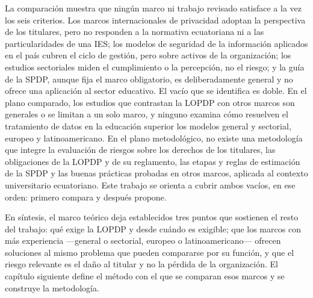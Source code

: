 La comparación muestra que ningún marco ni trabajo revisado satisface a la vez los seis criterios. Los marcos internacionales de privacidad adoptan la perspectiva de los titulares, pero no responden a la normativa ecuatoriana ni a las particularidades de una IES; los modelos de seguridad de la información aplicados en el país cubren el ciclo de gestión, pero sobre activos de la organización; los estudios sectoriales miden el cumplimiento o la percepción, no el riesgo; y la guía de la SPDP, aunque fija el marco obligatorio, es deliberadamente general y no ofrece una aplicación al sector educativo. El vacío que se identifica es doble. En el plano comparado, los estudios que contrastan la LOPDP con otros marcos son generales o se limitan a un solo marco, y ninguno examina cómo resuelven el tratamiento de datos en la educación superior los modelos general y sectorial, europeo y latinoamericano. En el plano metodológico, no existe una metodología que integre la evaluación de riesgos sobre los derechos de los titulares, las obligaciones de la LOPDP y de su reglamento, las etapas y reglas de estimación de la SPDP y las buenas prácticas probadas en otros marcos, aplicada al contexto universitario ecuatoriano. Este trabajo se orienta a cubrir ambos vacíos, en ese orden: primero compara y después propone.


En síntesis, el marco teórico deja establecidos tres puntos que sostienen el resto del trabajo: qué exige la LOPDP y desde cuándo es exigible; que los marcos con más experiencia ---general o sectorial, europeo o latinoamericano--- ofrecen soluciones al mismo problema que pueden compararse por su función, y que el riesgo relevante es el daño al titular y no la pérdida de la organización. El capítulo siguiente define el método con el que se comparan esos marcos y se construye la metodología.
